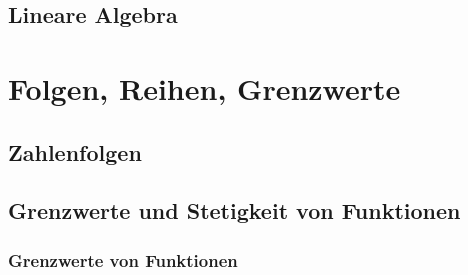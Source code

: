 \section{Lineare Algebra}


\chapter{Folgen, Reihen, Grenzwerte}
\section{Zahlenfolgen}

\setcounter{subsection}{2}


\section{Grenzwerte und Stetigkeit von Funktionen}
\subsection{Grenzwerte von Funktionen}
